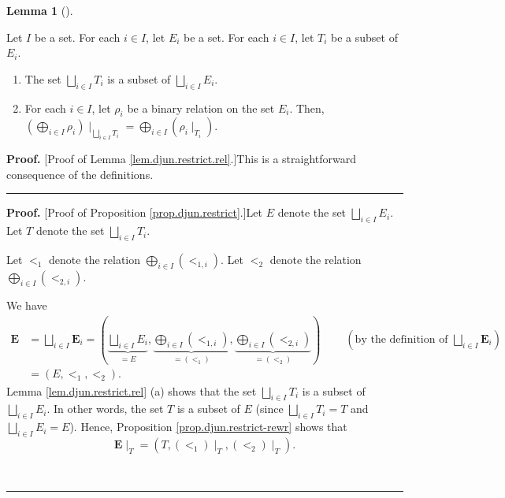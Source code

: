 \documentclass[numbers=enddot,12pt,final,onecolumn,notitlepage,abstracton]{scrartcl}
\theoremstyle{definition}
\newtheorem{lem}[theo]{Lemma}
\newenvironment{lemma}[1][]
{\begin{lem}[#1]\begin{leftbar}}
{\end{leftbar}\end{lem}}
\newenvironment{proof}[1][Proof]{\noindent\textbf{#1.} }{\ \rule{0.5em}{0.5em}}
\newenvironment{verlong}{}{}
\begin{document}
\begin{verlong}
\begin{footnotesize}
\begin{lemma}
\label{lem.djun.restrict.rel}Let $I$ be a set. For each $i\in I$, let $E_{i}$
be a set. For each $i\in I$, let $T_{i}$ be a subset of $E_{i}$.

\begin{enumerate}
\item[(a)] The set $\bigsqcup_{i\in I}T_{i}$ is a subset of $\bigsqcup_{i\in
I}E_{i}$.

\item[(b)] For each $i\in I$, let $\rho_{i}$ be a binary relation on the set
$E_{i}$. Then, $\left(  \bigoplus_{i\in I}\rho_{i}\right)  \mid_{\bigsqcup
_{i\in I}T_{i}}=\bigoplus_{i\in I}\left(  \rho_{i}\mid_{T_{i}}\right)  $.
\end{enumerate}
\end{lemma}

\begin{proof}
[Proof of Lemma \ref{lem.djun.restrict.rel}.]This is a straightforward
consequence of the definitions.
\end{proof}

\begin{proof}
[Proof of Proposition \ref{prop.djun.restrict}.]Let $E$ denote the set
$\bigsqcup_{i\in I}E_{i}$. Let $T$ denote the set $\bigsqcup_{i\in I}T_{i}$.

Let $<_{1}$ denote the relation $\bigoplus_{i\in I}\left(  <_{1,i}\right)  $.
Let $<_{2}$ denote the relation $\bigoplus_{i\in I}\left(  <_{2,i}\right)  $.

We have
\begin{align*}
\mathbf{E}  &  =\bigsqcup_{i\in I}\mathbf{E}_{i}=\left(  \underbrace{\bigsqcup
_{i\in I}E_{i}}_{=E},\underbrace{\bigoplus_{i\in I}\left(  <_{1,i}\right)
}_{=\left(  <_{1}\right)  },\underbrace{\bigoplus_{i\in I}\left(
<_{2,i}\right)  }_{=\left(  <_{2}\right)  }\right)
\ \ \ \ \ \ \ \ \ \ \left(  \text{by the definition of }\bigsqcup_{i\in
I}\mathbf{E}_{i}\right) \\
&  =\left(  E,<_{1},<_{2}\right)  .
\end{align*}
Lemma \ref{lem.djun.restrict.rel} (a) shows that the set $\bigsqcup_{i\in
I}T_{i}$ is a subset of $\bigsqcup_{i\in I}E_{i}$. In other words, the set $T$
is a subset of $E$ (since $\bigsqcup_{i\in I}T_{i}=T$ and $\bigsqcup_{i\in
I}E_{i}=E$). Hence, Proposition \ref{prop.djun.restrict-rewr} shows that
\begin{equation}
\mathbf{E}\mid_{T}=\left(  T,\left(  <_{1}\right)  \mid_{T},\left(
<_{2}\right)  \mid_{T}\right)  . \label{pf.prop.djun.restrict.3}%
\end{equation}



\end{proof}
\end{footnotesize}
\end{verlong}
\end{document}
